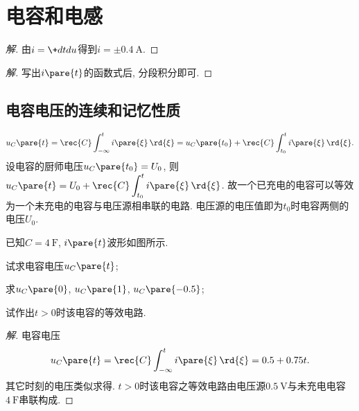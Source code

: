 \documentclass{ctexart}
\begin{document}
\section{电容和电感} %
\label{sec:电容和电感}

\begin{sample}
    \begin{ex}
    \end{ex}
    \begin{proof}[解]
        由$\displaystyle i = \+dtdu$得到$i=\pm\SI{0.4}{\ampere}$.
    \end{proof}
\end{sample}
\begin{sample}
    \begin{ex}
    \end{ex}
    \begin{proof}[解]
        写出$i\pare{t}$的函数式后, 分段积分即可.
    \end{proof}
\end{sample}

\subsection{电容电压的连续和记忆性质} %
\label{sub:电容电压的连续和记忆性质}

\[ u_C\pare{t} = \rec{C} \int_{-\infty}^t i\pare{\xi}\,\rd{\xi} = u_C\pare{t_0} + \rec{C} \int_{t_0}^t i\pare{\xi}\,\rd{\xi}. \]
设电容的厨师电压$u_C\pare{t_0} = U_0$, 则$u_C\pare{t} = U_0 + \displaystyle \rec{C} \int_{t_0}^t i\pare{\xi}\,\rd{\xi}$. 故{\color{red}一个已充电的电容可以等效为一个未充电的电容与电压源相串联的电路. 电压源的电压值即为$t_0$时电容两侧的电压$U_0$}.


\begin{sample}
    \begin{ex}
         已知$C = \SI{4}{\farad}$, $i\pare{t}$波形如图所示.
        \begin{cenum}
            \item 试求电容电压$u_C\pare{t}$;
            \item 求$u_C\pare{0}$, $u_C\pare{1}$, $u_C\pare{-0.5}$;
            \item 试作出$t>0$时该电容的等效电路.
        \end{cenum}
    \end{ex}
    \begin{proof}[解]
        电容电压
        \[ u_C\pare{t} = \rec{C} \int_{-\infty}^t i\pare{\xi}\,\rd{\xi} = 0.5 + 0.75t. \]
        其它时刻的电压类似求得. $t>0$时该电容之等效电路由电压源$\SI{0.5}{\volt}$与未充电电容$\SI{4}{\farad}$串联构成.
    \end{proof}
\end{sample}
\end{document}
